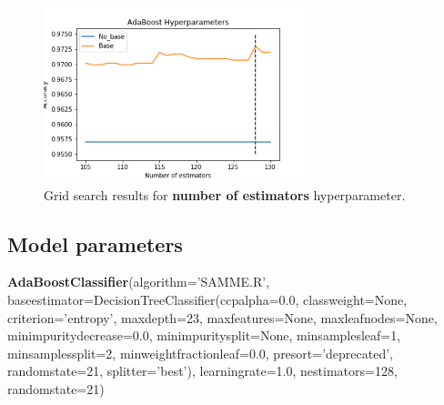 \documentclass[11pt, letterpaper]{article}
\begin{document}
\begin{figure}[h]
\begin{center}
\includegraphics[width=3in]{ABHyperparameters.png}
\caption{Grid search results for \textbf{number of estimators} hyperparameter.} 
\label{fig:ABHyper}
\end{center}
\end{figure}

\subsection{Model parameters}
\noindent \textbf{AdaBoostClassifier}(algorithm='SAMME.R',
                   base\textunderscore estimator=DecisionTreeClassifier(ccp\textunderscore alpha=0.0,
                                                         class\textunderscore weight=None,
                                                         criterion='entropy',
                                                         max\textunderscore depth=23,
                                                         max\textunderscore features=None,
                                                         max\textunderscore leaf\textunderscore nodes=None,
                                                         min\textunderscore impurity\textunderscore decrease=0.0,
                                                         min\textunderscore impurity\textunderscore split=None,
                                                         min\textunderscore samples\textunderscore leaf=1,
                                                         min\textunderscore samples\textunderscore split=2,
                                                         min\textunderscore weight\textunderscore fraction\textunderscore leaf=0.0,
                                                         presort='deprecated',
                                                         random\textunderscore state=21,
                                                         splitter='best'),
                   learning\textunderscore rate=1.0, n\textunderscore estimators=128, random\textunderscore state=21)
\end{document}
